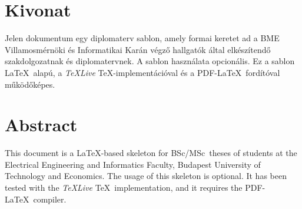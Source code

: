 \setcounter{page}{1}

\selecthungarian

\chapter*{Kivonat}

Jelen dokumentum egy diplomaterv sablon, amely formai keretet ad a BME Villamosmérnöki és Informatikai Karán végző hallgatók által elkészítendő szakdolgozatnak és diplomatervnek. A sablon használata opcionális. Ez a sablon \LaTeX~alapú, a \emph{TeXLive} \TeX-implementációval és a PDF-\LaTeX~fordítóval működőképes.


\vfill
\selectenglish


\chapter*{Abstract}

This document is a \LaTeX-based skeleton for BSc/MSc~theses of students at the Electrical Engineering and Informatics Faculty, Budapest University of Technology and Economics. The usage of this skeleton is optional. It has been tested with the \emph{TeXLive} \TeX~implementation, and it requires the PDF-\LaTeX~compiler.


\vfill
\selectthesislanguage

\setcounter{romanPage}{\value{page}}
